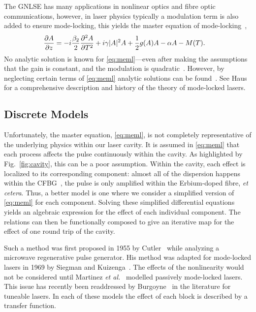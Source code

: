 \documentclass[9pt,twocolumn,twoside]{osajnl}
\newcommand{\pdiff}[3][\hspace{-0.5pt}]{\frac{\partial^{#1}#2}{\partial{#3}^{#1}}} %
\begin{document}
The GNLSE has many applications in nonlinear optics and fibre optic communications, however, in laser physics typically a modulation term is also added to ensure mode-locking, this yields the master equation of mode-locking~\cite{haus1984, haus1975, haus1986, haus1992, haus2000, tamura1996, usechak2005},
\begin{align}
	\pdiff{A}{z} &= - i \frac{\beta_2}{2}\pdiff[2]{A}{T} + i \gamma |A|^2 A + \frac{1}{2}g(A) A - \alpha A - M(T).
	\label{eq:meml}
\end{align}
No analytic solution is known for \eqref{eq:meml}---even after making the assumptions that the gain is constant, and the modulation is quadratic~\cite{haus1984, haus1975, haus1996}. However, by neglecting certain terms of \eqref{eq:meml} analytic solutions can be found~\cite{burgoyne2014, haus1975, haus1986, haus1991, haus1992, haus1996, tamura1996, usechak2005}. See Haus~\cite{haus2000} for a comprehensive description and history of the theory of mode-locked lasers.

\subsection{Discrete Models}
\label{sec:discrete}
Unfortunately, the master equation, \eqref{eq:meml}, is not completely representative of the underlying physics within our laser cavity. It is assumed in \eqref{eq:meml} that each process affects the pulse continuously within the cavity. As highlighted by Fig.~\ref{fig:cavity}, this can be a poor assumption. Within the cavity, each effect is localized to its corresponding component: almost all of the dispersion happens within the CFBG~\cite{agrawal2002}, the pulse is only amplified within the Erbium-doped fibre, \emph{et cetera}. Thus, a better model is one where we consider a simplified version of \eqref{eq:meml} for each component. Solving these simplified differential equations yields an algebraic expression for the effect of each individual component. The relations can then be functionally composed to give an iterative map for the effect of one round trip of the cavity.

Such a method was first proposed in 1955 by Cutler~\cite{cutler1955} while analyzing a microwave regenerative pulse generator. His method was adapted for mode-locked lasers in 1969 by Siegman and Kuizenga~\cite{kuizenga1970a, kuizenga1970b, kuizenga1970, siegman1969}. The effects of the nonlinearity would not be considered until Martinez \emph{et al.}~\cite{martinez1984, martinez1985} modelled passively mode-locked lasers. This issue has recently been readdressed by Burgoyne~\cite{burgoyne2014} in the literature for tuneable lasers. In each of these models the effect of each block is described by a transfer function.
\end{document}
